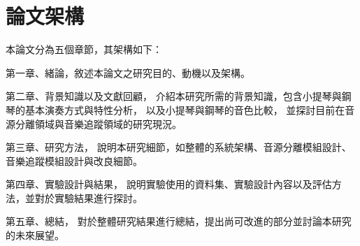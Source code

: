 \documentclass[class=NCU_thesis, crop=false]{standalone}
\begin{document}


\pagebreak

\section{論文架構}
本論文分為五個章節，其架構如下：

第一章、緒論，敘述本論文之研究目的、動機以及架構。

第二章、背景知識以及文獻回顧，
介紹本研究所需的背景知識，包含小提琴與鋼琴的基本演奏方式與特性分析，
以及小提琴與鋼琴的音色比較，
並探討目前在音源分離領域與音樂追蹤領域的研究現況。

第三章、研究方法，
說明本研究細節，如整體的系統架構、音源分離模組設計、音樂追蹤模組設計與改良細節。

第四章、實驗設計與結果，
說明實驗使用的資料集、實驗設計內容以及評估方法，並對於實驗結果進行探討。

第五章、總結，
對於整體研究結果進行總結，提出尚可改進的部分並討論本研究的未來展望。

\pagebreak
\end{document}
